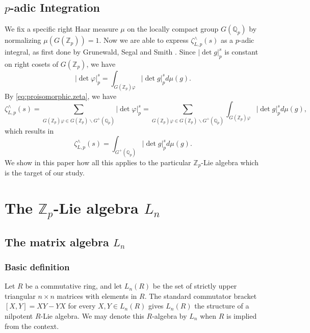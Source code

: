 \documentclass{article}
\begin{document}
\subsection{$p$-adic Integration}
We fix a specific right Haar measure $\mu$ on the locally compact group $G(\mathbb{Q}_{p})$ by normalizing $\mu(G(\mathbb{Z}_p))=1$. Now we are able to express $\zeta_{L,p}^{\wedge}(s)$ as a $p$-adic integral, as first done by Grunewald, Segal and Smith \cite[Proposition 4.2]{GrunewaldSegalSmith}. Since $|\det{g}|_{p}^{s}$ is constant on right cosets of $G(\mathbb{Z}_{p})$, we have \[|\det\varphi|_{p}^{s}=\displaystyle\int_{G(\mathbb{Z}_p)\varphi}{|\det{g}|_{p}^{s}}d\mu(g).\]
By \eqref{eq:proisomorphic.zeta}, we have \[\zeta_{L,p}^{\wedge}(s)=\underset{\scriptscriptstyle G(\mathbb{Z}_p)\varphi\in G(\mathbb{Z}_p)\backslash{G^{+}(\mathbb{Q}_p)}}{\sum}|\det\varphi|_{p}^{s}=\underset{\scriptscriptstyle{G(\mathbb{Z}_p)}\varphi\in G(\mathbb{Z}_p)\backslash{G^{+}(\mathbb{Q}_p)}}{\sum}\displaystyle{\int_{G(\mathbb{Z}_p)\varphi}}{|\det{g}|_{p}^{s}}d\mu(g),\]
which results in \begin{equation}
\label{eq:p-adic.integral}
\zeta_{L,p}^{\wedge}(s)=\displaystyle\int_{G^{+}(\mathbb{Q}_p)}{|\det{g}|_{p}^{s}}d\mu(g).
\end{equation}
We show in this paper how all this applies to the particular $\mathbb{Z}_p$-Lie algebra which is the target of our study.
\section{The $\mathbb{Z}_p$-Lie algebra $L_n$}
\subsection{The matrix algebra $L_n$}
\label{R-algebra-definition}
\subsubsection{Basic definition}
\label{R-algebra-basic-definition}
Let $R$ be a commutative ring, and let $L_{n}(R)$ be the set of strictly upper triangular $n\times{n}$ matrices with elements in $R$. The standard commutator bracket $[X,Y]=XY-YX$ for every $X,Y\in{L}_n(R)$ gives $L_{n}(R)$ the structure of a nilpotent $R$-Lie algebra.
We may denote this $R$-algebra by $L_n$ when $R$ is implied from the context.
\end{document}
